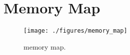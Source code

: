 \chapter{Memory Map}

\begin{figure}[H]
  \centering
  \texttt{[image: ./figures/memory\_map]}
  \caption{\pulpino memory map.}
  \label{fig:pulpino_memory_map}
\end{figure}


